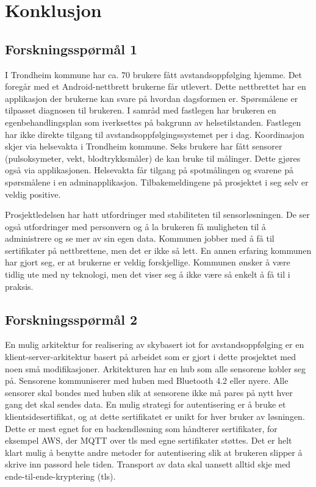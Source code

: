 \chapter{Konklusjon}
\label{ch:conclusion}

\section{Forskningsspørmål 1}
\textbf{}

I Trondheim kommune har ca. 70 brukere fått avstandsoppfølging hjemme. Det
foregår med et Android-nettbrett brukerne får utlevert. Dette nettbrettet har en
applikasjon der brukerne kan svare på hvordan dagsformen er. Spørsmålene er
tilpasset diagnosen til brukeren. I samråd med fastlegen har brukeren en
egenbehandlingsplan som iverksettes på bakgrunn av helsetilstanden. Fastlegen
har ikke direkte tilgang til avstandsoppfølgingssystemet per i dag. Koordinasjon skjer via
helsevakta i Trondheim kommune. Seks brukere har fått sensorer (pulsoksymeter, vekt, blodtrykksmåler) de kan bruke
til målinger. Dette gjøres også via applikasjonen. Helsevakta får tilgang på
spotmålingen og svarene på spørsmålene i en adminapplikasjon.
Tilbakemeldingene på prosjektet i seg selv er veldig positive.

Prosjektledelsen har hatt utfordringer med stabiliteten til sensorløsningen.
De ser også utfordringer med personvern og å la brukeren få muligheten til å administrere og se mer av sin egen data.
Kommunen jobber med å få til sertifikater på nettbrettene, men det er ikke så lett. En annen erfaring
kommunen har gjort seg, er at brukerne er veldig forskjellige. Kommunen ønsker å være tidlig ute med
ny teknologi, men det viser seg å ikke være så enkelt å få til i praksis.

\section{Forskningsspørmål 2}
\textbf{}

En mulig arkitektur for realisering av skybasert \gls{iot} for
avstandsoppfølging er en klient-server-arkitektur basert på arbeidet som er
gjort i dette prosjektet med noen små modifikasjoner. Arkitekturen har en hub som
alle sensorene kobler seg på. Sensorene kommuniserer med huben med Bluetooth 4.2
eller nyere. Alle sensorer skal bondes med huben slik at sensorene ikke må pares
på nytt hver gang det skal sendes data. En mulig strategi for autentisering er å
bruke et klientsidesertifikat, og at dette sertifikatet er unikt for hver bruker
av løsningen. Dette er mest egnet for en backendløsning som håndterer
sertifikater, for eksempel AWS, der MQTT over \gls{tls} med egne sertifikater
støttes. Det er helt klart mulig å benytte andre metoder for autentisering slik
at brukeren slipper å skrive inn passord hele tiden. Transport av data skal
uansett alltid skje med ende-til-ende-kryptering (\gls{tls}).

